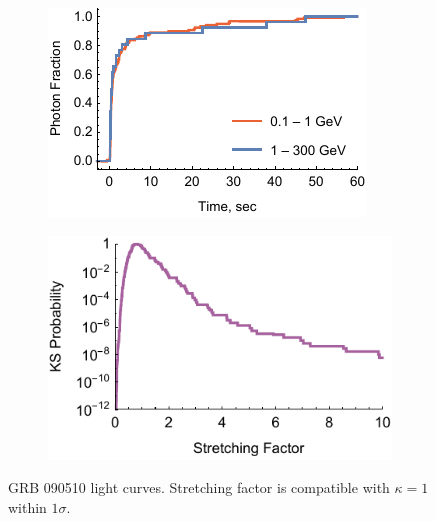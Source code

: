 \documentclass{article}
\begin{document}
\begin{figure}
        \centering
        \begin{subfigure}{0.49\textwidth}
                \includegraphics[width=\textwidth]{lightCurve090510}
                \label{fig:lightCurve090510}
        \end{subfigure}
        \begin{subfigure}{0.49\textwidth}
                \includegraphics[width=\textwidth]{probabilities090510}
                \label{fig:probabilities090510}
        \end{subfigure}
        \caption{GRB 090510 light curves. Stretching factor is compatible with $\kappa = 1$ within $1\sigma$.}
        \label{fig:grb090510}
\end{figure}
\end{document}
